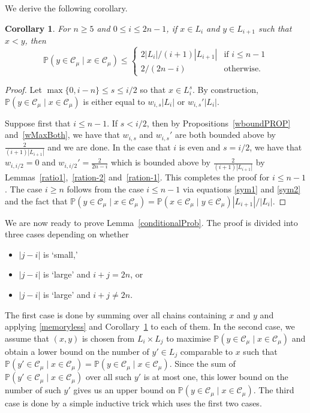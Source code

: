\documentclass[11 pt]{article}
\newtheorem{cor}[equation]{Corollary}
\theoremstyle{definition}
\theoremstyle{case}
\numberwithin{equation}{section}
\begin{document}
We derive the following corollary.

\begin{cor}
\label{OneStep}
For $n\geq5$ and $0\leq i\leq 2n-1$, if $x\in L_i$ and $y\in L_{i+1}$ such that $x<y$, then
\[\mathbb{P}\left(y\in \mathcal{C}_\mu\mid x\in\mathcal{C}_\mu\right) \leq 
\begin{cases}	2|L_i|/(i+1)|L_{i+1}| 	& \text{if }i\leq n-1 \\
							2/(2n-i)					& \text{otherwise.}\end{cases}\]
\end{cor}

\begin{proof}
Let $\max\{0,i-n\}\leq s\leq i/2$ so that $x\in L_i^s$. By construction, $\mathbb{P}\left(y\in \mathcal{C}_\mu\mid x\in\mathcal{C}_\mu\right)$ is either equal to $w_{i,s}|L_i|$ or $w_{i,s}'|L_i|$. 

Suppose first that $i\leq n-1$. If $s<i/2$, then by Propositions~\ref{wboundPROP} and~\ref{wMaxBoth}, we have that $w_{i,s}$ and $w_{i,s}'$ are both bounded above by $\frac{2}{(i+1)|L_{i+1}|}$ and we are done. In the case that $i$ is even and $s=i/2$, we have that $w_{i,i/2}=0$ and $w_{i,i/2}' = \frac{2}{2n-i}$ which is bounded above by $\frac{2}{(i+1)|L_{i+1}|}$ by Lemmas~\ref{ratio1},~\ref{ration-2} and~\ref{ration-1}. This completes the proof for $i\leq n-1$. The case $i\geq n$ follows from the case $i\leq n-1$ via equations \eqref{sym1} and \eqref{sym2} and the fact that $\mathbb{P}\left(y\in \mathcal{C}_\mu\mid x\in\mathcal{C}_\mu\right) = \mathbb{P}\left(x\in \mathcal{C}_\mu\mid y\in\mathcal{C}_\mu\right)|L_{i+1}|/|L_i|$. 
\end{proof}

We are now ready to prove Lemma~\ref{conditionalProb}. The proof is divided into three cases depending on whether
\begin{itemize}
\item $|j-i|$ is `small,' 
\item $|j-i|$ is `large' and $i+j=2n$, or 
\item $|j-i|$ is `large' and $i+j\neq 2n$.
\end{itemize}
The first case is done by summing over all chains containing $x$ and $y$ and applying \eqref{memoryless} and Corollary~\ref{OneStep} to each of them. In the second case, we assume that $(x,y)$ is chosen from $L_i\times L_j$ to maximise $\mathbb{P}\left(y\in\mathcal{C}_\mu\mid x\in\mathcal{C}_\mu\right)$ and obtain a lower bound on the number of $y'\in L_j$ comparable to $x$ such that $\mathbb{P}\left(y'\in\mathcal{C}_\mu\mid x\in\mathcal{C}_\mu\right)=\mathbb{P}\left(y\in\mathcal{C}_\mu\mid x\in\mathcal{C}_\mu\right)$. Since the sum of $\mathbb{P}\left(y'\in\mathcal{C}_\mu\mid x\in\mathcal{C}_\mu\right)$ over all such $y'$ is at most one, this lower bound on the number of such $y'$ gives us an upper bound on $\mathbb{P}\left(y\in\mathcal{C}_\mu\mid x\in\mathcal{C}_\mu\right)$. The third case is done by a simple inductive trick which uses the first two cases.
\end{document}
